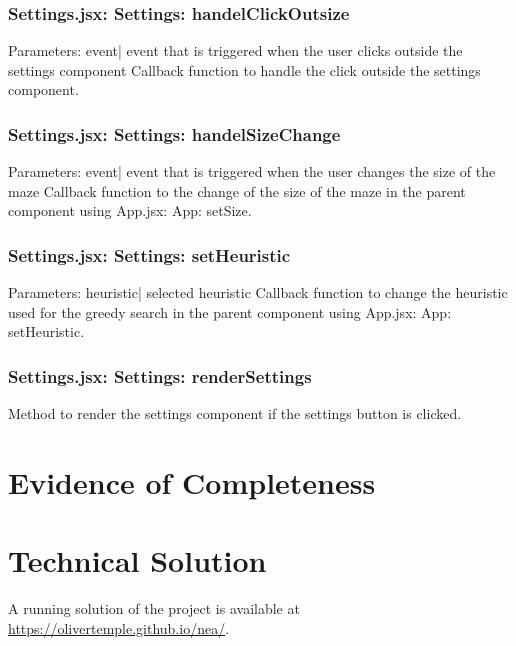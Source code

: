 \documentclass{article}
\begin{document}
\subsubsection{Settings.jsx: Settings: handelClickOutsize}
Parameters:\newline
\indent event| event that is triggered when the user clicks outside the settings component\newline
Callback function to handle the click outside the settings component.

\subsubsection{Settings.jsx: Settings: handelSizeChange}
Parameters:\newline
\indent event| event that is triggered when the user changes the size of the maze\newline
Callback function to the change of the size of the maze in the parent component using App.jsx: App: setSize.

\subsubsection{Settings.jsx: Settings: setHeuristic}
Parameters:\newline
\indent heuristic| selected heuristic\newline
Callback function to change the heuristic used for the greedy search in the parent component using App.jsx: App: setHeuristic.

\subsubsection{Settings.jsx: Settings: renderSettings}
Method to render the settings component if the settings button is clicked.


\section{Evidence of Completeness}  

\section{Technical Solution}
A running solution of the project is available at \url{https://olivertemple.github.io/nea/}.
\end{document}
